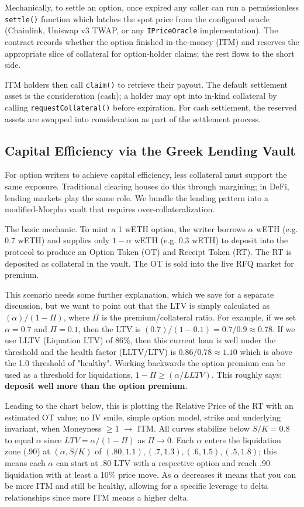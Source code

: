 \documentclass[%
 reprint,
 amsmath,amssymb,
 aps,
 prl,
floatfix,
]{revtex4-2}
\newcommand{\greekfi}{Greek }
\begin{document}
Mechanically, to settle an option, once expired any caller can run a permissionless 
\texttt{settle()} function which latches the spot price from the configured oracle
(Chainlink, Uniswap v3 TWAP, or any \texttt{IPriceOracle} implementation). The contract
records whether the option finished in-the-money (ITM) and reserves the appropriate
slice of collateral for option-holder claims; the rest flows to the short side.

ITM holders then call \texttt{claim()} to retrieve their payout. 
The default settlement asset is the consideration (cash); 
a holder may opt into in-kind collateral by calling \texttt{requestCollateral()} before expiration. 
For cash settlement, the reserved assets are swapped into consideration as part of the settlement process. 

\subsection{Capital Efficiency via the \greekfi Lending Vault}

For option writers to achieve capital efficiency, less collateral must support the same exposure.
Traditional clearing houses do this through margining; in DeFi, lending markets play the same role. 
We bundle the lending pattern into a modified-Morpho vault that requires over-collateralization.

The basic mechanic. To mint a 1 wETH option, 
the writer borrows $\alpha$ wETH (e.g. 0.7 wETH) and supplies only $1 - \alpha$ wETH (e.g. 0.3 wETH) 
to deposit into the protocol to produce an Option Token (OT)  and Receipt Token (RT).
The RT is deposited as collateral in the vault.
The OT is sold into the live RFQ market for premium. 

This scenario needs some further explanation, which we save for a separate discussion, 
but we want to point out that the LTV is simply calculated as $(\alpha) / (1 - \Pi)$, 
where $\Pi$ is the premium/collateral ratio. 
For example, if we set $\alpha = 0.7$ and $\Pi = 0.1$, then the LTV is $(0.7)/(1-0.1) = 0.7/0.9 \approx 0.78$.
If we use LLTV (Liquation LTV) of 86\%, then this current loan is well under the threshold and 
the health factor (LLTV/LTV) is $0.86/0.78 \approx 1.10$ which is above the 1.0 threshold of "healthy".
Working backwards the option premium can be used as a threshold for liquidations, $1-\Pi \geq (\alpha / LLTV)$.
This roughly says: \textbf{deposit well more than the option premium}.

Leading to the chart below, this is plotting the Relative Price of the RT with an estimated OT value; 
no IV smile, simple option model, strike and underlying invariant, 
when Moneyness $\geq 1$ $\rightarrow$ ITM. 
All curves stabilize below $S/K=0.8$ to equal $\alpha$ since $LTV = \alpha / (1-\Pi)$ as $\Pi \rightarrow 0$.
Each $\alpha$ enters the liquidation zone (.90) at $(\alpha, S/K)$ of $(.80, 1.1), (.7, 1.3), (.6, 1.5), (.5, 1.8)$;
this means each $\alpha$ can start at .80 LTV with a respective option and reach .90 liquidation with at least a 10\% price move.
As $\alpha$ decreases it means that you can be more ITM and still be healthy, 
allowing for a specific leverage to delta relationships since more ITM means a higher delta.
\end{document}
